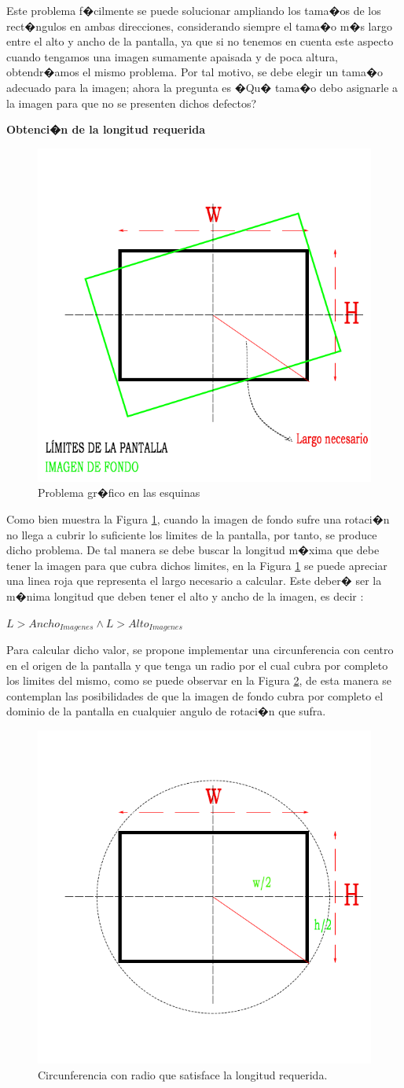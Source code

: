 \begin{enumerate}
\begin{enumerate}
		\subitem Este problema f�cilmente se puede solucionar ampliando los tama�os de los rect�ngulos en ambas direcciones, considerando siempre el tama�o m�s largo entre el alto y ancho de la pantalla, ya que si no tenemos en cuenta este aspecto cuando tengamos una imagen sumamente apaisada y de poca altura, obtendr�amos el mismo problema. Por tal motivo, se debe elegir un tama�o adecuado para la imagen; ahora la pregunta es �Qu� tama�o debo asignarle a la imagen para que no se presenten dichos defectos? 
		
		
		\textbf{Obtenci�n de la longitud requerida}
		
		\begin{figure}[h]
			\centering
			\includegraphics[width=0.3\linewidth, width=0.3\linewidth]{Imagenes/problemaPuntas}
			\caption{Problema gr�fico en las esquinas}
			\label{fig:problemapuntas}
		\end{figure}
		Como bien muestra la Figura \ref{fig:problemapuntas}, cuando la imagen de fondo sufre una rotaci�n no llega a cubrir lo suficiente los limites de la pantalla, por tanto, se  produce dicho problema. De tal manera se debe buscar la longitud m�xima que debe tener la imagen para que cubra dichos limites, en la Figura  \ref{fig:problemapuntas} se puede apreciar una linea roja que representa el largo necesario a calcular. Este deber� ser la m�nima longitud que deben tener el alto y ancho de la imagen, es decir :
		
		\begin{center}
			$L > Ancho_{Imagenes}  \land L > Alto_{Imagenes}   $ 
		\end{center}
		
		Para calcular dicho valor, se propone implementar una circunferencia con centro en el origen de la pantalla y que tenga un radio por el cual cubra por completo los limites del mismo, como se puede observar en la Figura \ref{fig:problemapuntas2}, de esta manera se contemplan las posibilidades de que la imagen de fondo cubra por completo el dominio de la pantalla en cualquier angulo de rotaci�n que sufra. 
		\begin{figure}[h]
			\centering
			\includegraphics[width=0.3\linewidth, width=0.3\linewidth]{Imagenes/problemaPuntas2}
			\caption{Circunferencia con radio que satisface la longitud requerida.}
			\label{fig:problemapuntas2}
		\end{figure}
		

\end{enumerate}
\end{enumerate}
